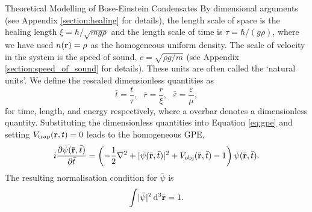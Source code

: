 \begin{chapter}{\label{cha:theoretical_model}Theoretical Modelling of Bose-Einstein Condensates}
		By dimensional arguments (see Appendix \ref{section:healing} for details), the length scale of space is the healing length $\xi = \hbar/\sqrt{mg\rho}$ and the length scale of time is $\tau = \hbar/(g\rho)$, where we have used $n({\bf r}) = \rho$ as the homogeneous uniform density. The scale of velocity in the system is the speed of sound, $c=\sqrt{\rho g/m}$ (see Appendix \ref{section:speed_of_sound} for details). These units are often called the `natural units'. We define the rescaled dimensionless quantities as
		\begin{equation}
			\bar{t} = \frac{t}{\tau}, ~~~ \bar{r} = \frac{r}{\xi}, ~~~ \bar{\varepsilon} = \frac{\varepsilon}{\mu},
		\end{equation}
		for time, length, and energy respectively, where a overbar denotes a dimensionless quantity. Substituting the dimensionless quantities into Equation \ref{eq:gpe} and setting $V_{\mathrm{trap}}({\bf r},t) = 0$ leads to the homogeneous GPE,
		\begin{equation}\label{eq:dimgpehomg}
		i\frac{\partial\bar{\psi}({\bar{\bf r}},\bar{t})}{\partial {\bar{t}}} = \left( -\frac{1}{2}\bar{\nabla}^2 + |\bar{\psi}({\bar{\bf r}},\bar{t})|^2 + \bar{V}_{\mathrm{obj}}({\bar{\bf r}},\bar{t}) - 1 \right) \bar{\psi}({\bar{\bf r}},\bar{t}).
		\end{equation}
		The resulting normalisation condition for $\bar{\psi}$ is
		\begin{equation}\label{eq:intwfhomg}
			\int \! |\bar{\psi}|^2 \, \mathrm{d}^3\bar{\bf r} = 1.
		\end{equation}


\end{chapter}
